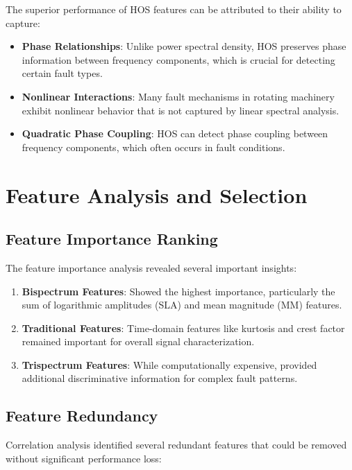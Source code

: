 The superior performance of HOS features can be attributed to their ability to capture:

\begin{itemize}
    \item \textbf{Phase Relationships}: Unlike power spectral density, HOS preserves phase information between frequency components, which is crucial for detecting certain fault types.
    \item \textbf{Nonlinear Interactions}: Many fault mechanisms in rotating machinery exhibit nonlinear behavior that is not captured by linear spectral analysis.
    \item \textbf{Quadratic Phase Coupling}: HOS can detect phase coupling between frequency components, which often occurs in fault conditions.
\end{itemize}

\section{Feature Analysis and Selection}

\subsection{Feature Importance Ranking}

The feature importance analysis revealed several important insights:

\begin{enumerate}
    \item \textbf{Bispectrum Features}: Showed the highest importance, particularly the sum of logarithmic amplitudes (SLA) and mean magnitude (MM) features.
    \item \textbf{Traditional Features}: Time-domain features like kurtosis and crest factor remained important for overall signal characterization.
    \item \textbf{Trispectrum Features}: While computationally expensive, provided additional discriminative information for complex fault patterns.
\end{enumerate}

\subsection{Feature Redundancy}

Correlation analysis identified several redundant features that could be removed without significant performance loss:


